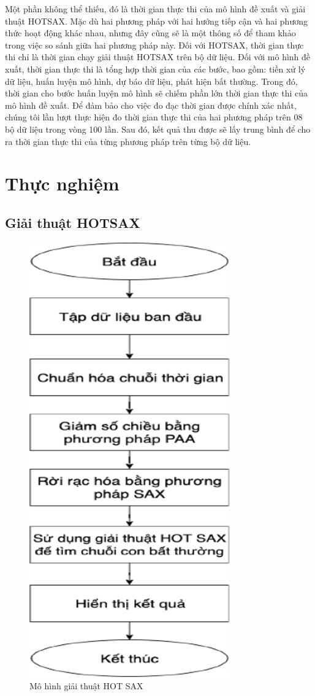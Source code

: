 Một phần không thể thiếu, đó là thời gian thực thi của mô hình đề xuất và giải thuật HOTSAX. Mặc dù hai phương pháp với hai hướng tiếp cận và hai phương thức hoạt động khác nhau, nhưng đây cũng sẽ là một thông số để tham khảo trong việc so sánh giữa hai phương pháp này. Đối với HOTSAX, thời gian thực thi chỉ là thời gian chạy giải thuật HOTSAX trên bộ dữ liệu. Đối với mô hình đề xuất, thời gian thực thi là tổng hợp thời gian của các bước, bao gồm: tiền xử lý dữ liệu, huấn luyện mô hình, dự báo dữ liệu, phát hiện bất thường. Trong đó, thời gian cho bước huấn luyện mô hình sẽ chiếm phần lớn thời gian thực thi của mô hình đề xuất. Để đảm bảo cho việc đo đạc thời gian được chính xác nhất, chúng tôi lần lượt thực hiện đo thời gian thực thi của hai phương pháp trên 08 bộ dữ liệu trong vòng 100 lần. Sau đó, kết quả thu được sẽ lấy trung bình để cho ra thời gian thực thi của từng phương pháp trên từng bộ dữ liệu.

\section{Thực nghiệm}
\subsection{Giải thuật HOTSAX}
\begin{figure}[H]
    \centering
    \includegraphics[scale=0.75]{./content/images/5-1.png}
    \caption{Mô hình giải thuật HOT SAX}
    \label{fig:5-1}
\end{figure}

